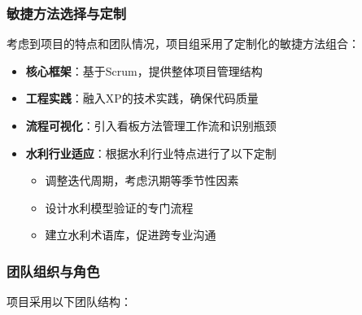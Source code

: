 \subsubsection{敏捷方法选择与定制}\label{ux654fux6377ux65b9ux6cd5ux9009ux62e9ux4e0eux5b9aux5236}

考虑到项目的特点和团队情况，项目组采用了定制化的敏捷方法组合：

\begin{itemize}
\tightlist
\item
  \textbf{核心框架}：基于Scrum，提供整体项目管理结构
\item
  \textbf{工程实践}：融入XP的技术实践，确保代码质量
\item
  \textbf{流程可视化}：引入看板方法管理工作流和识别瓶颈
\item
  \textbf{水利行业适应}：根据水利行业特点进行了以下定制

  \begin{itemize}
  \tightlist
  \item
    调整迭代周期，考虑汛期等季节性因素
  \item
    设计水利模型验证的专门流程
  \item
    建立水利术语库，促进跨专业沟通
  \end{itemize}
\end{itemize}

\subsubsection{团队组织与角色}\label{ux56e2ux961fux7ec4ux7ec7ux4e0eux89d2ux8272}

项目采用以下团队结构：

